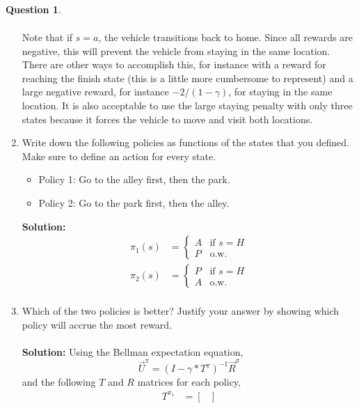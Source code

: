 \documentclass{article}
\theoremstyle{definition}
\newtheorem{question}[thm]{Question}
\begin{document}
\begin{question}
\begin{enumerate}[label=\alph*)]
\begin{align*}
        \end{align*}
        Note that if $s = a$, the vehicle transitions back to home. Since all rewards are negative, this will prevent the vehicle from staying in the same location. There are other ways to accomplish this, for instance with a reward for reaching the finish state (this is a little more cumbersome to represent) and a large negative reward, for instance $-2/(1-\gamma)$, for staying in the same location. It is also acceptable to use the large staying penalty with only three states because it forces the vehicle to move and visit both locations.
        \item Write down the following policies as functions of the states that you defined. Make sure to define an action for every state.
        \begin{itemize}[noitemsep]
            \item Policy 1: Go to the alley first, then the park.
            \item Policy 2: Go to the park first, then the alley.
        \end{itemize}
        \textbf{Solution: }
        \begin{align*}
            \pi_1(s) &= \begin{cases}
                            A& \text{if } s=H\\
                            P&\text{o.w.}
                        \end{cases}\\
            \pi_2(s) &= \begin{cases}
                            P& \text{if } s=H\\
                            A&\text{o.w.}
                        \end{cases}\\
        \end{align*}
        \item Which of the two policies is better? Justify your answer by showing which policy will accrue the most reward. \\ \\
        \textbf{Solution: } Using the Bellman expectation equation,
        \begin{equation*}
            \vec{U}^\pi = (I - \gamma*T^\pi)^{-1}\vec{R}^\pi
        \end{equation*}
        and the following $T$ and $R$ matrices for each policy,
        \begin{align*}
            T^{\pi_1} &= \begin{bmatrix}

\end{bmatrix}
\end{align*}
\end{enumerate}
\end{question}
\end{document}
